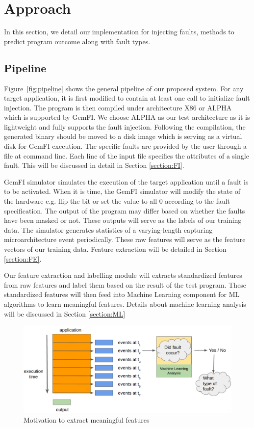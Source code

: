 \section{Approach}
In this section, we detail our implementation for injecting faults, methods to predict program outcome along with fault types.

\subsection{Pipeline}
Figure~\ref{fig:pipeline} shows the general pipeline of our proposed system. For any target application, it is first modified to contain at least one call to initialize fault injection. The program is then compiled under architecture X86 or ALPHA which is supported by GemFI. We choose ALPHA as our test architecture as it is lightweight and fully supports the fault injection. Following the compilation, the generated binary should be moved to a disk image which is serving as a virtual disk for GemFI execution. The specific faults are provided by the user through a file at command line. Each line of the input file specifies the attributes of a single fault. This will be discussed in detail in Section \ref{section:FI}. 

GemFI simulator simulates the execution of the target application until a fault is to be activated. When it is time, the GemFI simulator will modify the state of the hardware e.g. flip the bit or set the value to all 0 according to the fault specification. The output of the program may differ based on whether the faults have been masked or not. These outputs will serve as the labels of our training data. The simulator generates statistics of a varying-length capturing microarchitecture event periodically. These raw features will serve as the feature vectors of our training data. Feature extraction will be detailed in Section \ref{section:FE}. 

Our feature extraction and labelling module will extracts standardized features from raw features and label them based on the result of the test program. These standardized features will then feed into Machine Learning component for ML algorithms to learn meaningful features. Details about machine learning analysis will be discussed in Section \ref{section:ML}

\begin{figure}[t]
\begin{center}
   \includegraphics[width=0.95\linewidth]{./figures/teaser.png}
\end{center}
   \caption{\footnotesize Motivation to extract meaningful features}
\vspace{-0.5cm}
\label{fig:teaser}
\end{figure}

